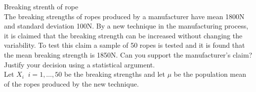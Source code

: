 \documentclass[bigtut]{tutorial}\usepackage[]{graphicx}\usepackage[]{color}
\makeatletter
\newcommand{\hlnum}[1]{\textcolor[rgb]{0.686,0.059,0.569}{#1}}%
\newcommand{\hlopt}[1]{\textcolor[rgb]{0,0,0}{#1}}%
\newcommand{\hlstd}[1]{\textcolor[rgb]{0.345,0.345,0.345}{#1}}%
\newcommand{\hlkwd}[1]{\textcolor[rgb]{0.737,0.353,0.396}{\textbf{#1}}}%
\newenvironment{kframe}{%
 \def\at@end@of@kframe{}%
 \ifinner\ifhmode%
  \def\at@end@of@kframe{\end{minipage}}%
  \begin{minipage}{\columnwidth}%
 \fi\fi%
 \def\FrameCommand##1{\hskip\@totalleftmargin \hskip-\fboxsep
 \colorbox{shadecolor}{##1}\hskip-\fboxsep
     \hskip-\linewidth \hskip-\@totalleftmargin \hskip\columnwidth}%
 \MakeFramed {\advance\hsize-\width
   \@totalleftmargin\z@ \linewidth\hsize
   \@setminipage}}%
 {\par\unskip\endMakeFramed%
 \at@end@of@kframe}
\newenvironment{knitrout}{}{} %
\makeatother
\begin{document}
\begin{tutorial}
\vspace{.5cm}
\begin{questions}

\question  Breaking strenth of rope \\

The breaking strengths of ropes produced by a
manufacturer have mean 1800N and standard deviation 100N. By a
new technique in the manufacturing process, it is claimed that the
breaking strength can be increased without changing the variability.
To test this claim a sample of 50 ropes is tested and it is found that the mean breaking strength
is 1850N. Can you support the manufacturer's claim? Justify your
decision using a statistical argument. \\

Let $X_{i} \;\; i=1,\ldots,50$ be the breaking strengths and let $\mu$ be the population mean of the ropes produced by the new technique. \\

\end{questions}
\end{tutorial}
\end{document}
